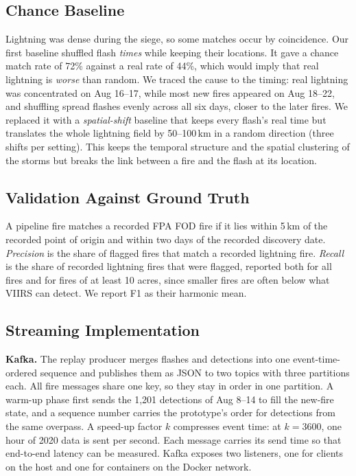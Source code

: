\documentclass[10pt,journal,compsoc]{IEEEtran}
\begin{document}
\subsection{Chance Baseline}
Lightning was dense during the siege, so some matches occur by coincidence. Our first baseline shuffled flash \emph{times} while keeping their locations. It gave a chance match rate of 72\% against a real rate of 44\%, which would imply that real lightning is \emph{worse} than random. We traced the cause to the timing: real lightning was concentrated on Aug 16--17, while most new fires appeared on Aug 18--22, and shuffling spread flashes evenly across all six days, closer to the later fires. We replaced it with a \emph{spatial-shift} baseline that keeps every flash's real time but translates the whole lightning field by 50--100\,km in a random direction (three shifts per setting). This keeps the temporal structure and the spatial clustering of the storms but breaks the link between a fire and the flash at its location.

\subsection{Validation Against Ground Truth}
A pipeline fire matches a recorded FPA FOD fire if it lies within 5\,km of the recorded point of origin and within two days of the recorded discovery date. \emph{Precision} is the share of flagged fires that match a recorded lightning fire. \emph{Recall} is the share of recorded lightning fires that were flagged, reported both for all fires and for fires of at least 10 acres, since smaller fires are often below what VIIRS can detect. We report F1 as their harmonic mean.

\subsection{Streaming Implementation}
\textbf{Kafka.} The replay producer merges flashes and detections into one event-time-ordered sequence and publishes them as JSON to two topics with three partitions each. All fire messages share one key, so they stay in order in one partition. A warm-up phase first sends the 1,201 detections of Aug 8--14 to fill the new-fire state, and a sequence number carries the prototype's order for detections from the same overpass. A speed-up factor $k$ compresses event time: at $k = 3600$, one hour of 2020 data is sent per second. Each message carries its send time so that end-to-end latency can be measured. Kafka exposes two listeners, one for clients on the host and one for containers on the Docker network.
\end{document}

